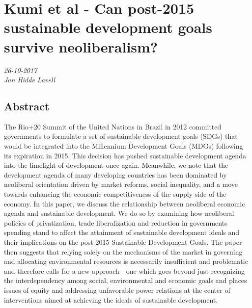 \chapter{Kumi et al - Can post-2015 sustainable development goals survive
neoliberalism?}
\textit{26-10-2017 \\
Jan Hidde Lavell} 

\section*{Abstract}
The Rio+20 Summit of the United Nations in Brazil in 2012 committed governments to formulate a set of sustainable development goals (SDGs) that would be integrated into the Millennium Development Goals (MDGs) following its expiration in 2015. This decision has pushed sustainable development agenda into the limelight of development once again. Meanwhile, we note that the development agenda of many developing countries has been dominated by neoliberal orientation driven by market reforms, social inequality, and a move towards enhancing the economic competitiveness of the supply side of the economy. In this paper, we discuss the relationship between neoliberal economic agenda and sustainable development. We do so by examining how neoliberal policies of privatization, trade liberalization and reduction in governments spending stand to affect the attainment of sustainable development ideals and their implications on the post-2015 Sustainable Development Goals. The paper then suggests that relying solely on the mechanisms of the market in governing and allocating environmental resources is necessarily insufficient and problematic and therefore calls for a new approach—one which goes beyond just recognizing the interdependency among social, environmental and economic goals and places issues of equity and addressing unfavorable power relations at the center of interventions aimed at achieving the ideals of sustainable development.

